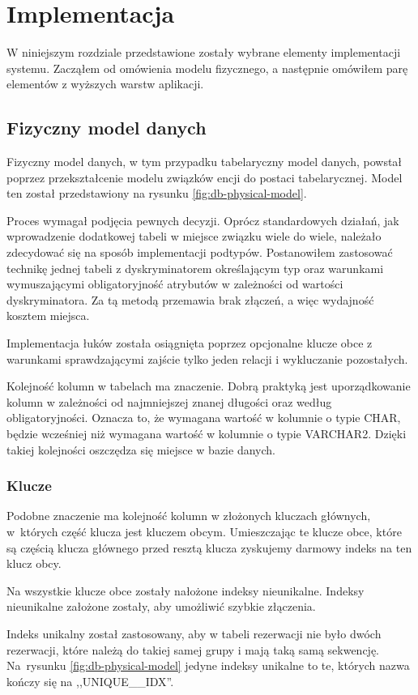 \documentclass[a4paper,onecolumn,oneside,11pt,wide,floatssmall]{mwrep}
\theoremstyle{definition}
\theoremstyle{plain}%
\theoremstyle{remark}
\begin{document}
\chapter{Implementacja}
W niniejszym rozdziale przedstawione zostały wybrane elementy implementacji systemu. Zacząłem od omówienia modelu fizycznego, a następnie omówiłem parę elementów z wyższych warstw aplikacji. 

\section{Fizyczny model danych}
Fizyczny model danych, w tym przypadku tabelaryczny model danych, powstał poprzez przekształcenie modelu związków encji do postaci tabelarycznej. Model ten został przedstawiony na rysunku \ref{fig:db-physical-model}.

Proces wymagał podjęcia pewnych decyzji. Oprócz standardowych działań, jak wprowadzenie dodatkowej tabeli w miejsce związku wiele do wiele, należało zdecydować się na sposób implementacji podtypów. Postanowiłem zastosować technikę jednej tabeli z dyskryminatorem określającym typ oraz warunkami wymuszającymi obligatoryjność atrybutów w zależności od wartości dyskryminatora. Za tą metodą przemawia brak złączeń, a więc wydajność kosztem miejsca.

Implementacja łuków została osiągnięta poprzez opcjonalne klucze obce z warunkami sprawdzającymi zajście tylko jeden relacji i wykluczanie pozostałych.

Kolejność kolumn w tabelach ma znaczenie. Dobrą praktyką jest uporządkowanie kolumn w zależności od najmniejszej znanej długości oraz według obligatoryjności. Oznacza to, że wymagana wartość w kolumnie o typie CHAR, będzie wcześniej niż wymagana wartość w kolumnie o typie VARCHAR2. Dzięki takiej kolejności oszczędza się miejsce w bazie danych.

\subsection{Klucze}
Podobne znaczenie ma kolejność kolumn w złożonych kluczach głównych, \mbox{w których} część klucza jest kluczem obcym. Umieszczając te klucze obce, które są częścią klucza głównego przed resztą klucza zyskujemy darmowy indeks na ten klucz obcy.

Na wszystkie klucze obce zostały nałożone indeksy nieunikalne. Indeksy nieunikalne założone zostały, aby umożliwić szybkie złączenia. 

Indeks unikalny został zastosowany, aby w tabeli rezerwacji nie było dwóch rezerwacji, które należą do takiej samej grupy i mają taką samą sekwencję. \mbox{Na rysunku} \ref{fig:db-physical-model} jedyne indeksy unikalne to te, których nazwa kończy się na ,,UNIQUE\_\_IDX''.
\end{document}
